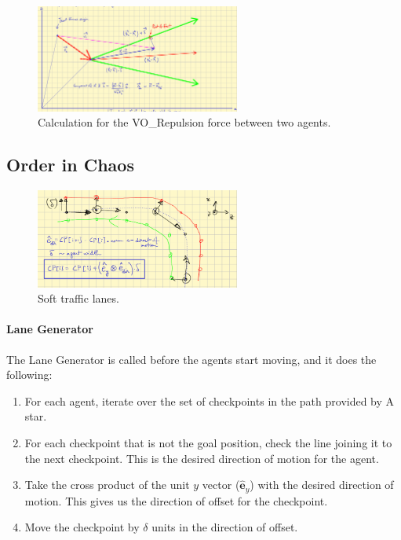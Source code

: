 \documentclass[a4paper,12pt]{article}
\begin{document}
\begin{figure}[!hptb]
  \centering
  \includegraphics[width= 0.6\textwidth]{./figures/VO_repulsion_calculation.png}
  \caption{Calculation for the VO\_Repulsion force between two agents.}
  \label{fig:velocity_obstacle_calculation}
\end{figure}

\subsection{Order in Chaos}

\begin{figure}[!hptb]
  \centering
  \includegraphics[width= 0.6\textwidth]{./figures/soft_traffic_lanes.png}
  \caption{Soft traffic lanes.}
  \label{fig:soft_traffic_lanes}
\end{figure}

\paragraph{Lane Generator} The Lane Generator is called before the agents start moving, and it does the following: 
\begin{enumerate}
  \item For each agent, iterate over the set of checkpoints in the path provided by A star.
  \item For each checkpoint that is not the goal position, check the line joining it to the next checkpoint. This is the desired direction of motion for the agent.
  \item Take the cross product of the unit $y$ vector ($\hat{\mathbf{e}}_{y}$) with the desired direction of motion. This gives us the direction of offset for the checkpoint.
  \item Move the checkpoint by $\delta$ units in the direction of offset.
\end{enumerate}
\end{document}
